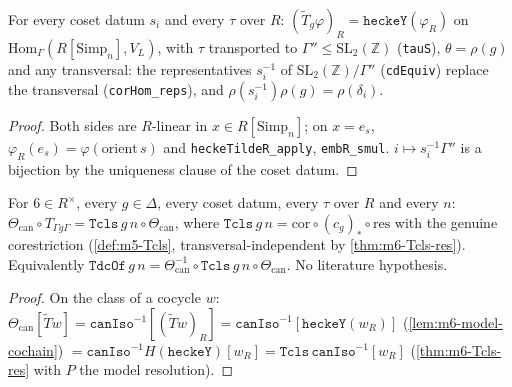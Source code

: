 \begin{lemma}\label{lem:m6-model-cochain}
  \leanok
  For every coset datum $s_i$ and every $\tau$ over $R$: $(\widetilde T_g\varphi)_R=\texttt{heckeY}(\varphi_R)$ on
  $\mathrm{Hom}_\Gamma(R[\mathrm{Simp}_n],V_L)$, with $\tau$ transported to $\Gamma''\le\mathrm{SL}_2(\mathbb Z)$ (\texttt{tauS}),
  $\theta=\rho(g)$ and any transversal: the representatives $s_i^{-1}$ of $\mathrm{SL}_2(\mathbb Z)/\Gamma''$ (\texttt{cdEquiv})
  replace the transversal (\texttt{corHom\_reps}), and $\rho(s_i^{-1})\rho(g)=\rho(\delta_i)$.
\end{lemma}
\begin{proof}
  \leanok
  Both sides are $R$-linear in $x\in R[\mathrm{Simp}_n]$; on $x=e_s$, $\varphi_R(e_s)=\varphi(\mathrm{orient}\,s)$ and
  \texttt{heckeTildeR\_apply}, \texttt{embR\_smul}. $i\mapsto s_i^{-1}\Gamma''$ is a bijection by the uniqueness clause of the coset
  datum.
\end{proof}

\begin{theorem}\label{thm:m6-classical}
  \leanok
  For $6\in R^\times$, every $g\in\Delta$, every coset datum, every $\tau$ over $R$ and every $n$:
  $\Theta_{\mathrm{can}}\circ T_{\Gamma g\Gamma}=\texttt{Tcls}\,g\,n\circ\Theta_{\mathrm{can}}$, where $\texttt{Tcls}\,g\,n=
  \mathrm{cor}\circ(c_g)_*\circ\mathrm{res}$ with the genuine corestriction (\ref{def:m5-Tcls}, transversal-independent by
  \ref{thm:m6-Tcls-res}). Equivalently $\texttt{TdcOf}\,g\,n=\Theta_{\mathrm{can}}^{-1}\circ\texttt{Tcls}\,g\,n\circ\Theta_{\mathrm{can}}$.
  No literature hypothesis.
\end{theorem}
\begin{proof}
  \leanok
  On the class of a cocycle $w$: $\Theta_{\mathrm{can}}[\widetilde Tw]=\texttt{canIso}^{-1}[(\widetilde Tw)_R]=
  \texttt{canIso}^{-1}[\texttt{heckeY}(w_R)]$ (\ref{lem:m6-model-cochain}) $=\texttt{canIso}^{-1}H(\texttt{heckeY})[w_R]=
  \texttt{Tcls}\,\texttt{canIso}^{-1}[w_R]$ (\ref{thm:m6-Tcls-res} with $P$ the model resolution).
\end{proof}

